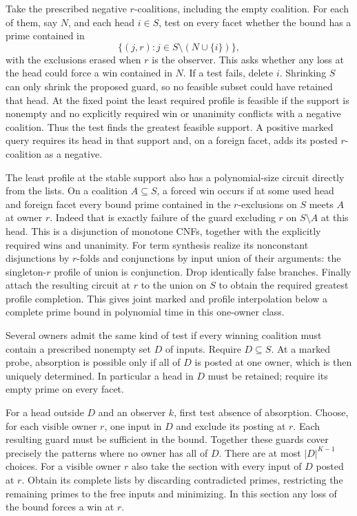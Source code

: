 Take the prescribed negative $r$-coalitions, including
the empty coalition. For each of them, say $N$, and each
head $i\in S$, test on every facet whether the bound has
a prime contained in
\[
        \{(j,r): j\in S\setminus(N\cup\{i\})\},
\]
with the exclusions erased when $r$ is the observer.
This asks whether any loss at the head could force a
win contained in $N$. If a test fails, delete $i$.
Shrinking $S$ can only shrink the proposed guard, so no
feasible subset could have retained that head. At the
fixed point the least required profile is feasible if
the support is nonempty and no explicitly required win
or unanimity conflicts with a negative coalition.
Thus the test finds the greatest feasible support.
A positive marked query requires its head in that
support and, on a foreign facet, adds its posted
$r$-coalition as a negative.

The least profile at the stable support also has a
polynomial-size circuit directly from the lists. On a
coalition $A\subseteq S$, a forced win occurs if at some
used head and foreign facet every bound prime contained
in the $r$-exclusions on $S$ meets $A$ at owner $r$.
Indeed that is exactly failure of the guard excluding
$r$ on $S\setminus A$ at this head. This is a disjunction
of monotone CNFs, together with the explicitly required
wins and unanimity. For term synthesis realize its
nonconstant disjunctions by $r$-folds and conjunctions
by input union of their arguments: the singleton-$r$
profile of union is conjunction. Drop identically false
branches. Finally attach the resulting circuit at $r$
to the union on $S$ to obtain the required greatest
profile completion. This gives joint marked and profile
interpolation below a complete prime bound in polynomial
time in this one-owner class.

Several owners admit the same kind of test if every
winning coalition must contain a prescribed nonempty
set $D$ of inputs. Require $D\subseteq S$. At a marked
probe, absorption is possible only if all of $D$ is
posted at one owner, which is then uniquely determined.
In particular a head in $D$ must be retained; require
its empty prime on every facet.

For a head outside $D$ and an observer $k$, first test
absence of absorption. Choose, for each visible owner
$r$, one input in $D$ and exclude its posting at $r$.
Each resulting guard must be sufficient in the bound.
Together these guards cover precisely the patterns
where no owner has all of $D$. There are at most
$|D|^{K-1}$ choices. For a visible owner $r$ also
take the section with every input of $D$ posted at $r$.
Obtain its complete lists by discarding contradicted
primes, restricting the remaining primes to the free
inputs and minimizing. In this section any loss of
the bound forces a win at $r$.

